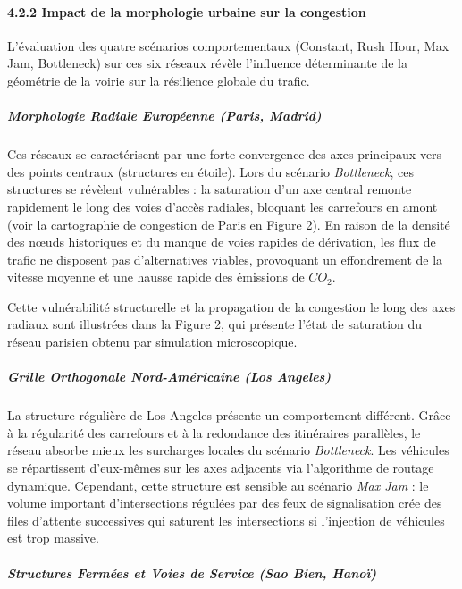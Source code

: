 \documentclass[10pt, a4paper]{article}
\begin{document}
\paragraph{4.2.2 Impact de la morphologie urbaine sur la
congestion}\label{impact-de-la-morphologie-urbaine-sur-la-congestion}

L'évaluation des quatre scénarios comportementaux (Constant, Rush Hour,
Max Jam, Bottleneck) sur ces six réseaux révèle l'influence déterminante
de la géométrie de la voirie sur la résilience globale du trafic.

\subparagraph{Morphologie Radiale Européenne (Paris,
Madrid)}\label{morphologie-radiale-europuxe9enne-paris-madrid}

Ces réseaux se caractérisent par une forte convergence des axes
principaux vers des points centraux (structures en étoile). Lors du
scénario \emph{Bottleneck}, ces structures se révèlent vulnérables : la
saturation d'un axe central remonte rapidement le long des voies d'accès
radiales, bloquant les carrefours en amont (voir la cartographie de
congestion de Paris en Figure 2). En raison de la densité des nœuds
historiques et du manque de voies rapides de dérivation, les flux de
trafic ne disposent pas d'alternatives viables, provoquant un
effondrement de la vitesse moyenne et une hausse rapide des émissions de
\(CO_2\).

Cette vulnérabilité structurelle et la propagation de la congestion le
long des axes radiaux sont illustrées dans la Figure 2, qui présente
l'état de saturation du réseau parisien obtenu par simulation
microscopique.

\subparagraph{Grille Orthogonale Nord-Américaine (Los
Angeles)}\label{grille-orthogonale-nord-amuxe9ricaine-los-angeles}

La structure régulière de Los Angeles présente un comportement
différent. Grâce à la régularité des carrefours et à la redondance des
itinéraires parallèles, le réseau absorbe mieux les surcharges locales
du scénario \emph{Bottleneck}. Les véhicules se répartissent d'eux-mêmes
sur les axes adjacents via l'algorithme de routage dynamique. Cependant,
cette structure est sensible au scénario \emph{Max Jam} : le volume
important d'intersections régulées par des feux de signalisation crée
des files d'attente successives qui saturent les intersections si
l'injection de véhicules est trop massive.

\subparagraph{Structures Fermées et Voies de Service (Sao Bien,
Hanoï)}\label{structures-fermuxe9es-et-voies-de-service-sao-bien-hanouxef}
\end{document}
